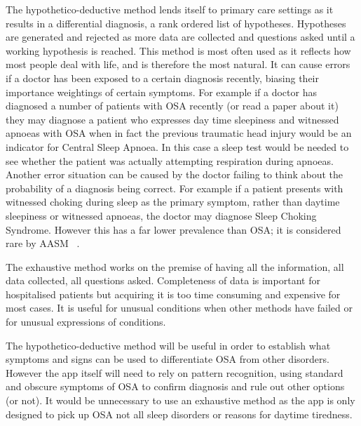 The hypothetico-deductive method lends itself to primary care settings as it results in a differential diagnosis, a rank ordered list of hypotheses. Hypotheses are generated and rejected as more data are collected and questions asked until a working hypothesis is reached. This method is most often used as it reflects how most people deal with life, and is therefore the most natural. It can cause errors if a doctor has been exposed to a certain diagnosis recently, biasing their importance weightings of certain symptoms. For example if a doctor has diagnosed a number of patients with OSA recently (or read a paper about it) they may diagnose a patient who expresses day time sleepiness and witnessed apnoeas with OSA when in fact the previous traumatic head injury would be an indicator for Central Sleep Apnoea. In this case a sleep test would be needed to see whether the patient was actually attempting respiration during apnoeas. Another error situation can be caused by the doctor failing to think about the probability of a diagnosis being correct. For example if a patient presents with witnessed choking during sleep as the primary symptom, rather than daytime sleepiness or witnessed apnoeas, the doctor may diagnose Sleep Choking Syndrome. However this has a far lower prevalence than OSA; it is considered rare by AASM ~\cite{american2001international}.

The exhaustive method works on the premise of having all the information, all data collected, all questions asked. Completeness of data is important for hospitalised patients but acquiring it is too time consuming and expensive for most cases. It is useful for unusual conditions when other methods have failed or for unusual expressions of conditions. 

The hypothetico-deductive method will be useful in order to establish what symptoms and signs can be used to differentiate OSA from other disorders. However the app itself will need to rely on pattern recognition, using standard and obscure symptoms of OSA to confirm diagnosis and rule out other options (or not). It would be unnecessary to use an exhaustive method as the app is only designed to pick up OSA not all sleep disorders or reasons for daytime tiredness.
